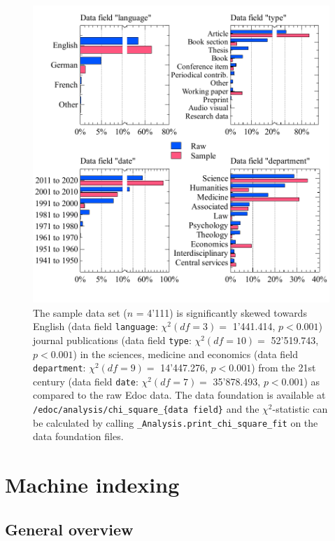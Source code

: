 \begin{figure}
\centering
\includegraphics{images/raw_sample_analysis.pdf}
\caption{The sample data set (\(n\) = 4'111) is significantly skewed
towards English (data field \texttt{language}: \(\chi^2 (df=3) =\)
1'441.414, \(p < 0.001\)) journal publications (data field
\texttt{type}: \(\chi^2 (df=10) =\) 52'519.743, \(p < 0.001\)) in the
sciences, medicine and economics (data field \texttt{department}:
\(\chi^2 (df=9) =\) 14'447.276, \(p < 0.001\)) from the 21st century
(data field \texttt{date}: \(\chi^2 (df=7) =\) 35'878.493,
\(p < 0.001\)) as compared to the raw Edoc data. The data foundation is
available at \texttt{/edoc/analysis/chi\_square\_\{data\ field\}} and
the \(\chi^2\)-statistic can be calculated by calling
\texttt{\_Analysis.print\_chi\_square\_fit} on the data foundation
files.}
\end{figure}

\hypertarget{machine-indexing}{%
\section{Machine indexing}\label{machine-indexing}}

\hypertarget{general-overview}{%
\subsection{General overview}\label{general-overview}}

